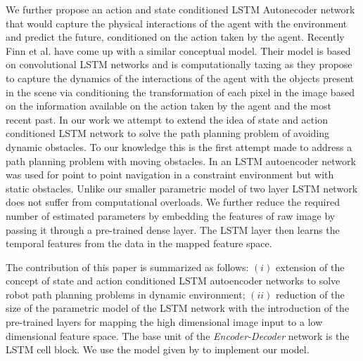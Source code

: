 \documentclass[sigconf]{acmart}
\begin{document}
We further propose an action and state conditioned LSTM Autonecoder network that would capture the physical interactions of the agent with the environment and predict the future, conditioned on the action taken by the agent. Recently Finn et al. \cite{finn} have come up with a similar conceptual model. Their model is based on convolutional LSTM networks and is computationally taxing as they propose to capture the dynamics of the interactions of the agent with the objects present in the scene via conditioning the transformation of each pixel in the image based on the information available on the action taken by the agent and the most recent past. In our work we attempt to extend the idea of state and action conditioned LSTM network to solve the path planning problem of avoiding dynamic obstacles. To our knowledge this is the first attempt made to address a path planning problem with moving obstacles. In \cite{inoue} an LSTM autoencoder network was used for point to point navigation in a constraint environment but with static obstacles. Unlike \cite{finn} our smaller parametric model of two layer LSTM network does not suffer from computational overloads. We further reduce the required number of estimated parameters by embedding the features of raw image by passing it through a pre-trained dense layer. The LSTM layer then learns the temporal features from the data in the mapped feature space.

The contribution of this paper is summarized as follows: $(i)$ extension of the concept of state and action conditioned LSTM autoencoder networks to solve robot path planning problems in dynamic environment; $(ii)$ reduction of the size of the parametric model of the LSTM network with the introduction of the pre-trained layers for mapping the high dimensional image input to a low dimensional feature space.
The base unit of the \textit{Encoder-Decoder} network is the LSTM cell block. We use the model given by \cite{graves} to implement our model.
\end{document}
